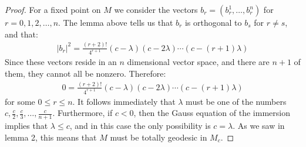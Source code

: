 \begin{proof} For a fixed point on $M$ we consider the vectors $b_r = ( b^1_r, \ldots, b^n_r )$ for $r = 0,1,2, \ldots, n$.  The lemma above tells us that $b_r$ is orthogonal to $b_s$ for $r \neq s$, and that:
%
\begin{align*}
| b_r |^2 = \frac{(r + 2)!}{4^{r + 1}} (c - \lambda)(c - 2 \lambda) \cdots (c - (r+1) \lambda)
\end{align*}
%
Since these vectors reside in an $n$ dimensional vector space, and there are $n+1$ of them, they cannot all be nonzero.  Therefore:
%
\begin{align*}
0 = \frac{(r + 2)!}{4^{r + 1}} (c - \lambda)(c - 2 \lambda) \cdots (c - (r+1) \lambda)
\end{align*}
%
for some $0 \leq r \leq n$.  It follows immediately that $\lambda$ must be one of the numbers $c, \frac{c}{2}, \frac{c}{3}, \ldots, \frac{c}{n + 1}$.  Furthermore, if $c < 0$, then the Gauss equation of the immersion implies that $\lambda \leq c$, and in this case the only possibility is $c = \lambda$.  As we saw in lemma 2, this means that $M$ must be totally geodesic in $M_c$.
\end{proof}

